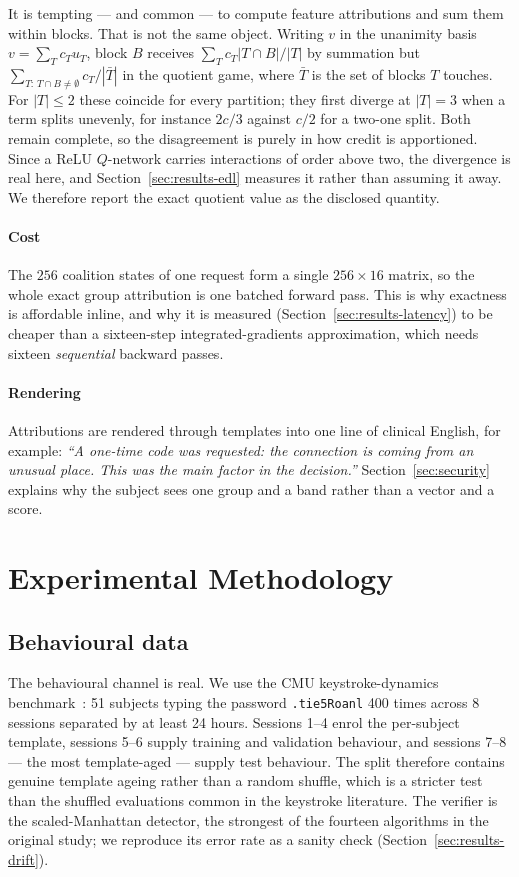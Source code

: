 \documentclass[conference]{IEEEtran}
\begin{document}
It is tempting --- and common --- to compute feature attributions and sum them
within blocks. That is not the same object. Writing $v$ in the unanimity basis
$v=\sum_T c_T u_T$, block $B$ receives $\sum_T c_T |T\cap B|/|T|$ by summation
but $\sum_{T:\,T\cap B\neq\emptyset} c_T / |\bar T|$ in the quotient game, where
$\bar T$ is the set of blocks $T$ touches. For $|T|\le 2$ these coincide for
every partition; they first diverge at $|T|=3$ when a term splits unevenly, for
instance $2c/3$ against $c/2$ for a two-one split. Both remain complete, so the
disagreement is purely in how credit is apportioned. Since a ReLU $Q$-network
carries interactions of order above two, the divergence is real here, and
Section~\ref{sec:results-edl} measures it rather than assuming it away. We
therefore report the exact quotient value as the disclosed quantity.

\paragraph{Cost}
The $256$ coalition states of one request form a single $256\times16$ matrix,
so the whole exact group attribution is one batched forward pass. This is why
exactness is affordable inline, and why it is measured
(Section~\ref{sec:results-latency}) to be cheaper than a sixteen-step
integrated-gradients approximation, which needs sixteen \emph{sequential}
backward passes.

\paragraph{Rendering}
Attributions are rendered through templates into one line of clinical English,
for example: \emph{``A one-time code was requested: the connection is coming
from an unusual place. This was the main factor in the decision.''}
Section~\ref{sec:security} explains why the subject sees one group and a band
rather than a vector and a score.

\section{Experimental Methodology}
\label{sec:method}

\subsection{Behavioural data}

The behavioural channel is real. We use the CMU keystroke-dynamics
benchmark~\cite{killourhy2009}: 51 subjects typing the password
\texttt{.tie5Roanl} 400 times across 8 sessions separated by at least 24 hours.
Sessions 1--4 enrol the per-subject template, sessions 5--6 supply training and
validation behaviour, and sessions 7--8 --- the most template-aged --- supply
test behaviour. The split therefore contains genuine template ageing rather
than a random shuffle, which is a stricter test than the shuffled evaluations
common in the keystroke literature. The verifier is the scaled-Manhattan
detector, the strongest of the fourteen algorithms in the original study; we
reproduce its error rate as a sanity check
(Section~\ref{sec:results-drift}).
\end{document}
